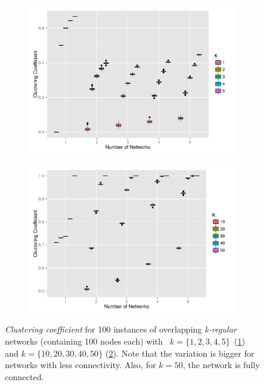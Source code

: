 \begin{figure}[H]
\centering
\begin{subfigure}{.5\linewidth}
  \centering
 \includegraphics[width=1\linewidth]{"../analysis/pdf/network_properties_cc_kreg_12345"}
 \caption{}
 \label{append_fig:network_properties_cc_kreg_12345}
\end{subfigure}%
\begin{subfigure}{.5\linewidth}
  \centering
 \includegraphics[width=1\linewidth]{"../analysis/pdf/network_properties_cc_kreg_1020304050"}
 \caption{}
 \label{append_fig:network_properties_cc_kreg_1020304050}
\end{subfigure}
\begin{minipage}{0.9\linewidth}
\vspace{0.2cm}
\caption{\textit{Clustering coefficient} for 100 instances of overlapping \textit{k-regular} networks (containing 100 nodes each) with ~$k=\{1,2,3,4,5\}$~(\ref{append_fig:network_properties_cc_kreg_12345}) and  $k= \{10,20,30,40,50\}$ (\ref{append_fig:network_properties_cc_kreg_1020304050}). Note that the variation is bigger for networks with less connectivity. Also, for $k=50$, the network is fully connected.}
\label{append_fig:network_properties_cc_kreg}
\end{minipage}
\end{figure}

